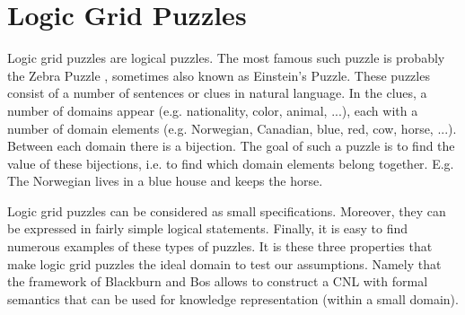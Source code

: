 \section{Logic Grid Puzzles}
Logic grid puzzles are logical puzzles. The most famous such puzzle is probably the Zebra Puzzle \cite{zebra}, sometimes also known as Einstein's Puzzle. These puzzles consist of a number of sentences or clues in natural language. In the clues, a number of domains appear (e.g. nationality, color, animal, ...), each with a number of domain elements (e.g. Norwegian, Canadian, blue, red, cow, horse, ...). Between each domain there is a bijection. The goal of such a puzzle is to find the value of these bijections, i.e. to find which domain elements belong together. E.g. The Norwegian lives in a blue house and keeps the horse.
 
Logic grid puzzles can be considered as small specifications. Moreover, they can be expressed in fairly simple logical statements. Finally, it is easy to find numerous examples of these types of puzzles. It is these three properties that make logic grid puzzles the ideal domain to test our assumptions. Namely that the framework of Blackburn and Bos allows to construct a CNL with formal semantics that can be used for knowledge representation (within a small domain).
